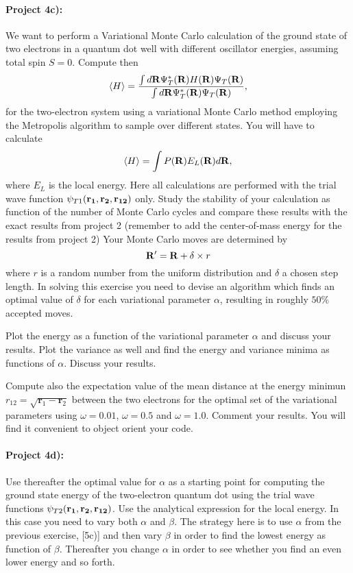 \documentclass[%
oneside,                 %
final,                   %
10pt]{article}
\begin{document}
\paragraph{Project 4c):}
We want to perform  a Variational Monte Carlo calculation of the ground state of two electrons in a quantum dot well with different oscillator energies, assuming total spin $S=0$.
Compute then
\[
\langle H \rangle = \frac{\int d{\bf
R}\Psi^{\ast}_T({\bf R})H({\bf R})\Psi_T({\bf R})}
{\int d{\bf
R}\Psi^{\ast}_T({\bf R})\Psi_T({\bf R})},
\]
for the two-electron
system using a variational Monte Carlo method employing the Metropolis
algorithm to sample over different states.  You will have to calculate
\[
\langle H \rangle =\int P({\bf R})E_L({\bf R})d{\bf R},
\]
where $E_L$ is the local energy.  Here all
calculations are performed with the trial wave function
$\psi_{T1}({\bf r_1},{\bf r_2}, {\bf r_{12}})$ only.  Study the
stability of your calculation as function of the number of Monte Carlo
cycles and compare these results with the exact results from project
2 (remember to add the center-of-mass energy for the results from project 2)
Your Monte Carlo moves are determined by
\[
{\bf R}' = {\bf R} +\delta\times r
\]
where $r$ is a random number from the uniform distribution and
$\delta$ a chosen step length.  In solving this
		       exercise you need to devise an algorithm which
		       finds an optimal value of $\delta$ for each
		       variational parameter $\alpha$, resulting in
		       roughly $50\%$ accepted moves.

Plot the energy as a function of the variational parameter $\alpha$ and discuss your results. Plot the variance as well
and find the energy and variance minima as functions of $\alpha$. Discuss your results.  

Compute also the expectation value of the mean distance at the energy minimun 
  $r_{12}=\sqrt{\mathbf{r}_1-\mathbf{r}_2}$ between the two electrons for the optimal set of the variational parameters using $\omega=0.01$,
  $\omega=0.5$ and $\omega=1.0$.  Comment your results. 
You will find it convenient to object orient your code.


\paragraph{Project 4d):}
Use thereafter the  optimal value for  $\alpha$ as a starting point for
computing the ground state energy of the two-electron quantum dot using the trial wave functions
$\psi_{T2}({\bf r_1},{\bf r_2}, {\bf r_{12}})$. Use the analytical expression for the local energy.
In this case you need to vary both $\alpha$ and $\beta$.
The strategy here is to use
$\alpha$ from the previous exercise, [5c)] and then
vary $\beta$ in order to find the lowest energy as function of
$\beta$. Thereafter you change
$\alpha$ in order to see whether you find an even lower energy and so forth.
\end{document}
